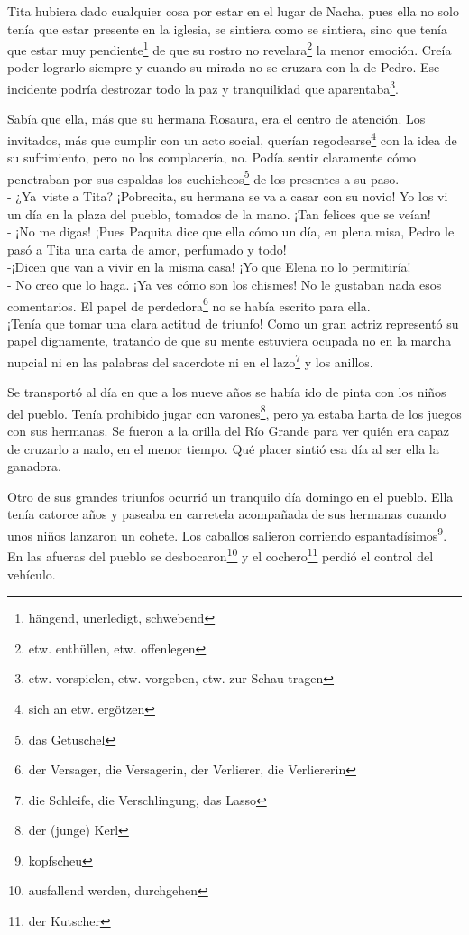 Tita hubiera dado cualquier cosa por estar en el lugar de Nacha, pues
ella no solo tenía que estar presente en la iglesia, se sintiera como se
sintiera, sino que tenía que estar muy pendiente\footnote{hängend, unerledigt, schwebend}
de que su rostro no revelara\footnote{etw. enthüllen, etw. offenlegen}
la menor emoción. Creía poder lograrlo siempre y cuando su
mirada no se cruzara con la de Pedro. Ese incidente podría destrozar
todo la paz y tranquilidad que aparentaba\footnote{etw. vorspielen, etw. vorgeben, etw. zur Schau tragen}.

Sabía que ella, más que su hermana Rosaura, era el centro de atención.
Los invitados, más que cumplir con un acto social, querían regodearse\footnote{sich an etw. ergötzen}
con la idea de su sufrimiento, pero no los complacería, no. Podía sentir
claramente cómo penetraban por sus espaldas los cuchicheos\footnote{das Getuschel}
de los presentes a su paso.
\\- ¿Ya~viste a Tita? ¡Pobrecita, su hermana se va a casar con su %
novio! Yo los vi un día en la plaza del pueblo, tomados de la mano. ¡Tan %
felices que se veían! %
\\- ¡No me digas! ¡Pues Paquita dice que ella cómo un día, en plena misa, %
Pedro le pasó a Tita una carta de amor, perfumado y todo! %
\\-¡Dicen que van a vivir en la misma casa! ¡Yo que Elena no lo %
permitiría! %
\\- No creo que lo haga. ¡Ya ves cómo son los chismes! No le gustaban nada %
esos comentarios. El papel de perdedora\footnote{der Versager, die Versagerin, der Verlierer, die Verliererin} %
no se había escrito para ella.\\

¡Tenía que tomar una clara actitud de triunfo! Como un gran actriz
representó su papel dignamente, tratando de que su mente estuviera
ocupada no en la marcha nupcial ni en las palabras del sacerdote ni en
el lazo\footnote{die Schleife, die Verschlingung, das Lasso} y
los anillos.

Se transportó al día en que a los nueve años se había ido de pinta con los
niños del pueblo. Tenía prohibido jugar con varones\footnote{der (junge) Kerl},
pero ya estaba harta de los juegos con sus hermanas. Se fueron a la
orilla del Río Grande para ver quién era capaz de cruzarlo a nado,
en el menor tiempo. Qué placer sintió esa día al ser ella la ganadora.

Otro de sus grandes triunfos ocurrió un tranquilo día domingo en el
pueblo. Ella tenía catorce años y paseaba en carretela acompañada de sus
hermanas cuando unos niños lanzaron un cohete. Los caballos salieron
corriendo espantadísimos\footnote{kopfscheu}. En las afueras
del pueblo se desbocaron\footnote{ausfallend werden, durchgehen}
y el cochero\footnote{der Kutscher} perdió el control del vehículo.

